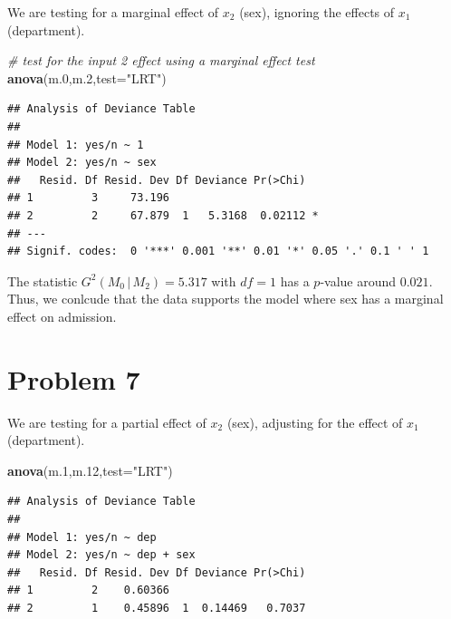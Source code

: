 \documentclass[
  11pt,
]{article}
\newenvironment{Shaded}{\begin{snugshade}}{\end{snugshade}}
\newcommand{\AttributeTok}[1]{\textcolor[rgb]{0.13,0.29,0.53}{#1}}
\newcommand{\CommentTok}[1]{\textcolor[rgb]{0.56,0.35,0.01}{\textit{#1}}}
\newcommand{\FloatTok}[1]{\textcolor[rgb]{0.00,0.00,0.81}{#1}}
\newcommand{\FunctionTok}[1]{\textcolor[rgb]{0.13,0.29,0.53}{\textbf{#1}}}
\newcommand{\NormalTok}[1]{#1}
\newcommand{\StringTok}[1]{\textcolor[rgb]{0.31,0.60,0.02}{#1}}
\begin{document}
We are testing for a marginal effect of \(x_2\) (sex), ignoring the
effects of \(x_1\) (department).

\begin{Shaded}
\begin{Highlighting}[]
\CommentTok{\# test for the input 2 effect using a marginal effect test}
\FunctionTok{anova}\NormalTok{(m}\FloatTok{.0}\NormalTok{,m}\FloatTok{.2}\NormalTok{,}\AttributeTok{test=}\StringTok{"LRT"}\NormalTok{)}
\end{Highlighting}
\end{Shaded}

\begin{verbatim}
## Analysis of Deviance Table
## 
## Model 1: yes/n ~ 1
## Model 2: yes/n ~ sex
##   Resid. Df Resid. Dev Df Deviance Pr(>Chi)  
## 1         3     73.196                       
## 2         2     67.879  1   5.3168  0.02112 *
## ---
## Signif. codes:  0 '***' 0.001 '**' 0.01 '*' 0.05 '.' 0.1 ' ' 1
\end{verbatim}

The statistic \(G^2(M_0\,|\,M_2) = 5.317\) with \(df=1\) has a
\(p\)-value around \(0.021\). Thus, we conlcude that the data supports
the model where sex has a marginal effect on admission.

\hypertarget{problem-7}{%
\section{Problem 7}\label{problem-7}}


We are testing for a partial effect of \(x_2\) (sex), adjusting for the
effect of \(x_1\) (department).

\begin{Shaded}
\begin{Highlighting}[]
\FunctionTok{anova}\NormalTok{(m}\FloatTok{.1}\NormalTok{,m}\FloatTok{.12}\NormalTok{,}\AttributeTok{test=}\StringTok{"LRT"}\NormalTok{)}
\end{Highlighting}
\end{Shaded}

\begin{verbatim}
## Analysis of Deviance Table
## 
## Model 1: yes/n ~ dep
## Model 2: yes/n ~ dep + sex
##   Resid. Df Resid. Dev Df Deviance Pr(>Chi)
## 1         2    0.60366                     
## 2         1    0.45896  1  0.14469   0.7037
\end{verbatim}
\end{document}

